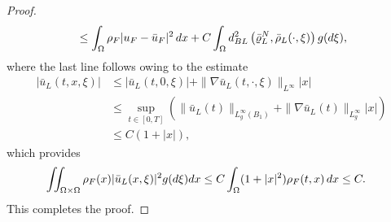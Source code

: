 \documentclass[10pt,a4paper]{amsart}
\newcommand{\dx}{\textnormal{d}x}
\newcommand{\dxi}{\textnormal{d}\xi}
\begin{document}
\begin{proof}
\begin{align*}
        &\quad \le \int_{\Omega}\rho_F|u_F - \bar u_F|^2\,\dx + C \int_{\Omega} d^2_{\rm BL}\left(\bar\varrho^N_L, \bar \rho_L(\cdot,\xi) \right)g(\dxi),
    \end{align*}
    where the last line follows owing to the estimate
    \begin{align*}
      |\bar u_L(t,x,\xi)| &\le |\bar u_L(t,0,\xi)| + \|\nabla \bar u_L(t,\cdot,\xi)\|_{L^\infty} |x| \\
      &\le \sup_{t\in [0,T]} \left(\|\bar u_L(t)\|_{L^\infty_g(B_1)} + \|\nabla \bar u_L(t)\|_{L^\infty_g} |x| \right) \\
      &\le C(1 + |x|),
    \end{align*} 
    which provides
    \begin{align*}
        \iint_{\Omega \times \Omega} \rho_F(x) |\bar u_L(x,\xi)|^2 g(\dxi)\dx &\le C\int_{\Omega} (1+|x|^2) \rho_F(t,x)\,\dx  \le C.
    \end{align*}
    This completes the proof.
\end{proof} 
\end{document}
